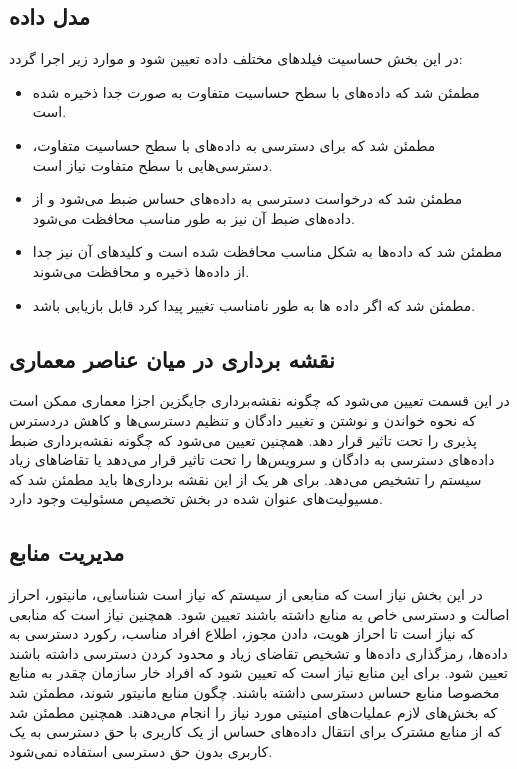 \subsection{مدل داده}
در این بخش حساسیت فیلد‌های مختلف داده تعیین شود و موارد زیر اجرا گردد:
\begin{itemize}
\item
مطمئن شد که داده‌های با سطح حساسیت متفاوت به صورت جدا ذخیره شده است.
\item
مطمئن شد که برای دسترسی به داده‌های با سطح حساسیت متفاوت، دسترسی‌هایی با سطح متفاوت نیاز است.
\item
مطمئن شد که درخواست دسترسی به داده‌های حساس ضبط می‌شود و از داده‌های ضبط آن نیز به طور مناسب محافظت می‌شود.
\item 
مطمئن شد که داده‌ها به شکل مناسب محافظت شده است و کلید‌های آن نیز جدا از داده‌ها  ذخیره و محافظت می‌شوند.
\item
مطمئن شد که اگر داده ‌ها به طور نامناسب تغییر پیدا کرد قابل بازیابی باشد.
\end{itemize}

\subsection{نقشه برداری در میان عناصر معماری}
در این قسمت تعیین می‌شود که چگونه نقشه‌برداری جایگزین اجزا معماری ممکن است که نحوه خواندن و نوشتن و تغییر دادگان و تنظیم دسترسی‌ها و کاهش دردسترس پذیری را تحت تاثیر قرار دهد. همچنین 
تعیین می‌شود که چگونه نقشه‌برداری ضبط داده‌های دسترسی به دادگان و سرویس‌ها را تحت تاثیر قرار می‌دهد یا تقاضاهای زیاد سیستم را تشخیص می‌دهد.  
برای هر یک از این نقشه برداری‌ها باید مطمئن شد که مسيولیت‌های عنوان شده در بخش تخصیص مسئولیت وجود دارد.
\subsection{مدیریت منابع}
در این بخش نیاز است که منابعی از سیستم که نیاز است شناسایی، مانیتور، احراز اصالت و دسترسی خاص به منابع داشته باشند تعیین شود.
همچنین نیاز است که منابعی که نیاز است تا احراز هویت، دادن مجوز، اطلاع افراد مناسب، رکورد دسترسی به داده‌ها، رمزگذاری داده‌ها و تشخیص تقاضای زیاد و محدود کردن دسترسی داشته باشند تعیین شود.
برای این منابع نیاز است که تعیین شود که افراد خار سازمان چقدر به منابع مخصوصا منابع حساس دسترسی داشته باشند. چگون  منابع مانیتور شوند، مطمئن شد که بخش‌های لازم عملیات‌های امنیتی مورد نیاز را انجام می‌دهند. 
همچنین مطمئن شد که از منابع مشترک برای انتقال داده‌های حساس از یک کاربری با حق دسترسی به یک کاربری بدون حق دسترسی استفاده نمی‌شود.

